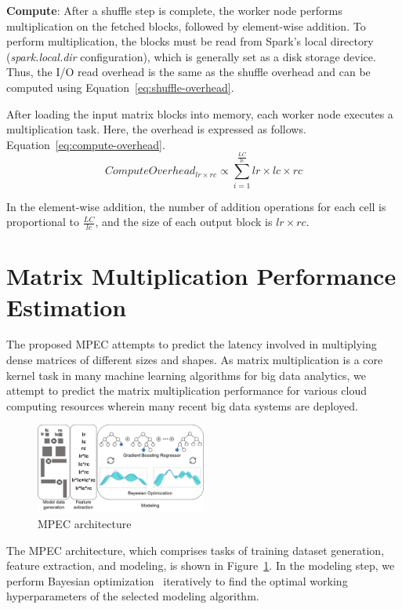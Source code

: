 \documentclass[10pt, conference, compsocconf]{IEEEtran}
\begin{document}
\textbf{Compute}: After a shuffle step is complete, the worker node performs multiplication on the fetched blocks, followed by element-wise addition. To perform multiplication, the blocks must be read from Spark's local directory (\textit{spark.local.dir} configuration), which is generally set as a disk storage device. Thus, the I/O read overhead is the same as the shuffle overhead and can be computed using Equation~\ref{eq:shuffle-overhead}.

After loading the input matrix blocks into memory, each worker node executes a multiplication task. Here, the overhead is expressed as follows. Equation~\ref{eq:compute-overhead}.
\begin{equation}\label{eq:compute-overhead}
  ComputeOverhead_{lr \times rc} \propto \sum\limits_{i=1}^{\frac{LC}{lc}} lr \times lc \times rc
\end{equation}

In the element-wise addition, the number of addition operations for each cell is proportional to $\frac{LC}{lc}$, and the size of each output block is $lr \times rc$.

\section{Matrix Multiplication Performance Estimation}\label{sec:mpc-structure}The proposed MPEC attempts to predict the latency involved in multiplying dense matrices of different sizes and shapes. As matrix multiplication is a core kernel task in many machine learning algorithms for big data analytics, we attempt to predict the matrix multiplication performance for various cloud computing resources wherein many recent big data systems are deployed.
\begin{figure}
  \centering\includegraphics[width=0.5\textwidth]{figures/mpc-architecture.pdf}\caption{MPEC architecture}\label{fig:mpc-architecture}
\end{figure}

The MPEC architecture, which comprises tasks of training dataset generation, feature extraction, and modeling, is shown in Figure~\ref{fig:mpc-architecture}. In the modeling step, we perform Bayesian optimization~\cite{bayesian-optimization} iteratively to find the optimal working hyperparameters of the selected modeling algorithm.
\end{document}
